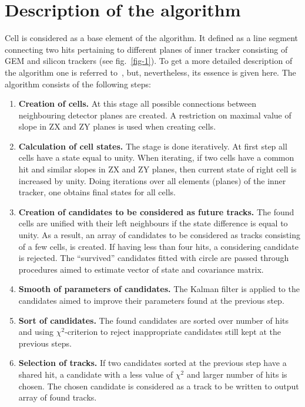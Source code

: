 \documentclass{webofc}
\begin{document}
\section{Description of the algorithm}
\label{sec-1}
Cell is considered as a base element of the algorithm. It defined as a line segment connecting two hits pertaining to different planes of inner tracker
consisting of GEM and silicon trackers (see fig.~\ref{fig-1}). To get a more detailed description of the algorithm one is referred to~\cite{baldin}, but, nevertheless, its essence is
given here.
The algorithm consists of the following steps:
\begin{enumerate}
	\item {\bf Creation of cells.}
	  At this stage all possible connections between neighbouring detector planes are created. A restriction on maximal value of slope in ZX and ZY planes is used when creating cells. 
	\item {\bf Calculation of cell states.}
          The stage is done iteratively. At first step all cells have a state equal to unity.
          When iterating, if two cells have a common hit and similar slopes in ZX and ZY planes, then current state of right cell is increased by unity.
          Doing iterations over all elements (planes) of the inner tracker, one obtains final states for all cells.
	\item {\bf Creation of candidates to be considered as future tracks.}
	  The found cells are unified with their left neighbours if the state difference is equal to unity. As a result, an array of candidates to be considered as tracks consisting of a few cells,
	  is created. If having less than four hits, a considering candidate is rejected. The ``survived'' candidates fitted with circle are passed through procedures aimed to estimate
          vector of state and covariance matrix.
	\item {\bf Smooth of parameters of candidates.}
	  The Kalman filter is applied to the candidates aimed to improve their parameters found at the previous step.
	\item {\bf Sort of candidates.}
	  The found candidates are sorted over number of hits and using $\chi^{2}$-criterion to reject inappropriate candidates still kept at the previous steps.
	\item {\bf Selection of tracks.}
	  If two candidates sorted at the previous step have a shared hit, a candidate with a less value of $\chi^{2}$ and larger number of hits is chosen.
          The chosen candidate is considered as a track to be written to output array of found tracks.     
\end{enumerate}
\end{document}
